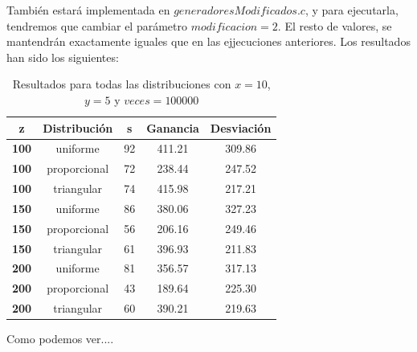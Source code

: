\documentclass[11pt,a4paper]{report}
\begin{document}
También estará implementada en $generadoresModificados.c$, y para ejecutarla, tendremos que cambiar el parámetro $modificacion=2$. El resto
de valores, se mantendrán exactamente iguales que en las ejjecuciones anteriores. Los resultados han sido los siguientes:

\begin{table}[H]
	\centering
	\begin{tabular}{c|cccc}
	\textbf{\hspace{5mm}z\hspace{5mm}}   & \textbf{Distribución} & \textbf{\hspace{5mm}s\hspace{5mm}} & \textbf{Ganancia} & \textbf{Desviación} \\ \hline
	\textbf{100} & uniforme 			 & 92         & 411.21            & 309.86 			  \\
	\textbf{100} & proporcional			 & 72         & 238.44            & 247.52			  \\
	\textbf{100} & triangular 			 & 74         & 415.98            & 217.21			  \\ \hline
	\textbf{150} & uniforme 			 & 86         & 380.06            & 327.23 			  \\
	\textbf{150} & proporcional			 & 56         & 206.16            & 249.46			  \\
	\textbf{150} & triangular 		     & 61         & 396.93            & 211.83			  \\ \hline
	\textbf{200} & uniforme 			 & 81         & 356.57            & 317.13 			  \\
	\textbf{200} & proporcional		     & 43         & 189.64            & 225.30			  \\
	\textbf{200} & triangular 		     & 60         & 390.21            & 219.63			  \\
	\end{tabular}
	\caption{Resultados para todas las distribuciones con $x=10$, $y=5$ y $veces=100000$}
\end{table}

Como podemos ver....
\end{document}
